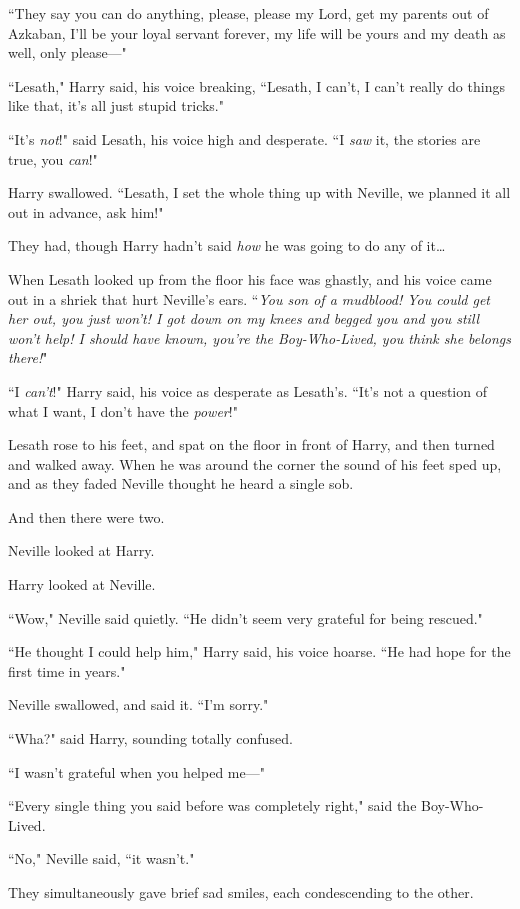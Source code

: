 ``They say you can do anything, please, please my Lord, get my parents out of Azkaban, I'll be your loyal servant forever, my life will be yours and my death as well, only please—"

``Lesath," Harry said, his voice breaking, ``Lesath, I can't, I can't really do things like that, it's all just stupid tricks."

``It's \emph{not}!" said Lesath, his voice high and desperate. ``I \emph{saw} it, the stories are true, you \emph{can}!"

Harry swallowed. ``Lesath, I set the whole thing up with Neville, we planned it all out in advance, ask him!"

They had, though Harry hadn't said \emph{how} he was going to do any of it{\ldots}

When Lesath looked up from the floor his face was ghastly, and his voice came out in a shriek that hurt Neville's ears. ``\emph{You son of a mudblood! You could get her out, you just won't! I got down on my knees and begged you and you still won't help! I should have known, you're the Boy-Who-Lived, you think she belongs there!}"

``I \emph{can't}!" Harry said, his voice as desperate as Lesath's. ``It's not a question of what I want, I don't have the \emph{power}!"

Lesath rose to his feet, and spat on the floor in front of Harry, and then turned and walked away. When he was around the corner the sound of his feet sped up, and as they faded Neville thought he heard a single sob.

And then there were two.

Neville looked at Harry.

Harry looked at Neville.

``Wow," Neville said quietly. ``He didn't seem very grateful for being rescued."

``He thought I could help him," Harry said, his voice hoarse. ``He had hope for the first time in years."

Neville swallowed, and said it. ``I'm sorry."

``Wha?" said Harry, sounding totally confused.

``I wasn't grateful when you helped me—"

``Every single thing you said before was completely right," said the Boy-Who-Lived.

``No," Neville said, ``it wasn't."

They simultaneously gave brief sad smiles, each condescending to the other.

